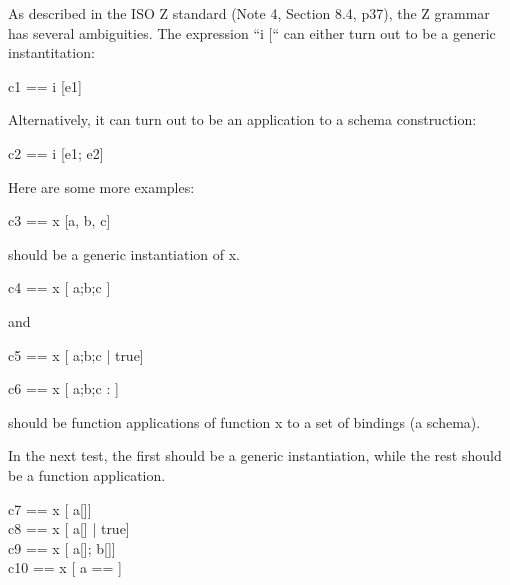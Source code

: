 As described in the ISO Z standard (Note 4, Section 8.4, p37), the Z
grammar has several ambiguities.  The expression ``i [``
can either turn out to be a generic instantitation:

\begin{zed}
  c1 == i [e1]
\end{zed}

Alternatively, it can turn out to be an application to a schema construction:

\begin{zed}
  c2 == i [e1; e2]
\end{zed}

Here are some more examples:

\begin{zed}
  c3 == x [a, b, c]
\end{zed}

should be a generic instantiation of x.

\begin{zed}
  c4 == x [ a;b;c ]
\end{zed}

and

\begin{zed}
  c5 == x [ a;b;c | true]
\end{zed}

\begin{zed}
  c6 == x [ a;b;c : \nat]
\end{zed}

should be function applications of function x to a set of bindings (a schema).

In the next test, the first should be a generic instantiation, while the 
rest should be a function application.
\begin{zed}
  c7 == x [ a[\nat]]\\
  c8 == x [ a[\nat] | true]\\
  c9 == x [ a[\nat]; b[\nat]]\\
  c10 == x [ a == \nat]
\end{zed}
